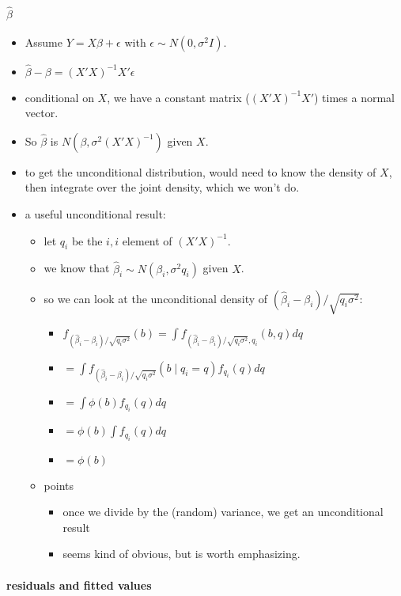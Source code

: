 \paragraph{$\hat\beta$}
\label{sec-3-3-1}

\begin{itemize}
\item Assume $Y = X\beta + \epsilon$ with $\epsilon \sim N(0,\sigma^2 I)$.
\item $\hat\beta - \beta = (X'X)^{-1} X'\epsilon$
\item conditional on $X$, we have a constant matrix ($(X'X)^{-1}X'$)
        times a normal vector.
\item So $\hat\beta$ is $N(\beta, \sigma^2 (X'X)^{-1})$ given $X$.
\item to get the unconditional distribution, would need to know the
        density of $X$, then integrate over the joint density, which we
        won't do.
\item a useful unconditional result:
\begin{itemize}
\item let $q_i$ be the $i,i$ element of $(X'X)^{-1}$.
\item we know that $\hat\beta_i \sim N(\beta_i, \sigma^2 q_i)$ given $X$.
\item so we can look at the unconditional density of
          $(\hat\beta_i - \beta_i)/\sqrt{q_i \sigma^2}$:
\begin{itemize}
\item $f_{(\hat\beta_i - \beta_i)/\sqrt{q_i \sigma^2}}(b) = \int f_{(\hat\beta_i -
            \beta_i)/\sqrt{q_i \sigma^2}, q_i} (b, q) dq$
\item $= \int f_{(\hat\beta_i - \beta_i)/\sqrt{q_i \sigma^2}}(b \mid q_i = q)
            f_{q_i}(q) dq$
\item $= \int \phi(b) f_{q_i}(q) dq$
\item $= \phi(b) \int f_{q_i}(q) dq$
\item $= \phi(b)$
\end{itemize}
\item points
\begin{itemize}
\item once we divide by the (random) variance, we get an
            unconditional result
\item seems kind of obvious, but is worth emphasizing.
\end{itemize}
\end{itemize}
\end{itemize}
\paragraph{residuals and fitted values}
\label{sec-3-3-2}

